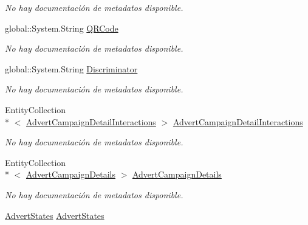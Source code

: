 \begin{DoxyCompactItemize}
\begin{DoxyCompactList}\small\item\em No hay documentación de metadatos disponible. \end{DoxyCompactList}\item 
global\-::\-System.\-String \hyperlink{class_game_memory_1_1_adverts_a14b533de1869e89623ca3e4e6e9f7009}{Q\-R\-Code}
\begin{DoxyCompactList}\small\item\em No hay documentación de metadatos disponible. \end{DoxyCompactList}\item 
global\-::\-System.\-String \hyperlink{class_game_memory_1_1_adverts_ad72413d0b9d943aadea17ebcb8b522ff}{Discriminator}
\begin{DoxyCompactList}\small\item\em No hay documentación de metadatos disponible. \end{DoxyCompactList}\item 
Entity\-Collection\\*
$<$ \hyperlink{class_game_memory_1_1_advert_campaign_detail_interactions}{Advert\-Campaign\-Detail\-Interactions} $>$ \hyperlink{class_game_memory_1_1_adverts_a98057d3b841f0aa787406ff1f7111ce1}{Advert\-Campaign\-Detail\-Interactions}
\begin{DoxyCompactList}\small\item\em No hay documentación de metadatos disponible. \end{DoxyCompactList}\item 
Entity\-Collection\\*
$<$ \hyperlink{class_game_memory_1_1_advert_campaign_details}{Advert\-Campaign\-Details} $>$ \hyperlink{class_game_memory_1_1_adverts_ada4c6a59fe3cddfeb554d415f894d742}{Advert\-Campaign\-Details}
\begin{DoxyCompactList}\small\item\em No hay documentación de metadatos disponible. \end{DoxyCompactList}\item 
\hyperlink{class_game_memory_1_1_advert_states}{Advert\-States} \hyperlink{class_game_memory_1_1_adverts_ac01d784c797e36812eb383f4920bb276}{Advert\-States}

\end{DoxyCompactItemize}
